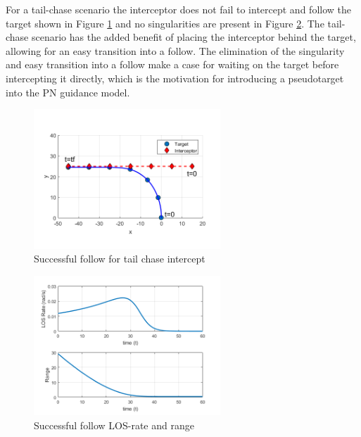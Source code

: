 \documentclass[conference]{IEEEtran}
\begin{document}
For a tail-chase scenario the interceptor does not fail to intercept and follow the target shown in Figure \ref{fig:successfulFollow} and no singularities are present in Figure \ref{fig:successfulFollowLOS}. The tail-chase scenario has the added benefit of placing the interceptor behind the target, allowing for an easy transition into a follow. The elimination of the singularity and easy transition into a follow make a case for waiting on the target before intercepting it directly, which is the motivation for introducing a pseudotarget into the PN guidance model.

\begin{figure}[H]
	\centering
	\includegraphics[width=7cm] {x15}
	\caption{Successful follow for tail chase intercept}
	\label{fig:successfulFollow}
	\hspace*{0mm}
\end{figure}

\begin{figure}[H]
	\centering
	\includegraphics[width=7cm] {x15_range_LOSrate}
	\caption{Successful follow LOS-rate and range}
	\label{fig:successfulFollowLOS}
		\hspace*{0mm}
\end{figure}

\end{document}
